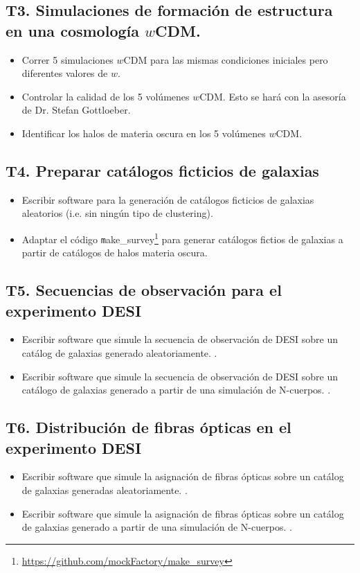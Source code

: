 \subsection*{T3. Simulaciones de formaci\'on de estructura en una
  cosmolog\'ia $w$CDM.}
\begin{itemize}
\item[T3.1] \gradA Correr 5 simulaciones $w$CDM para las mismas condiciones
  iniciales pero diferentes valores de $w$.
\item[T3.2] \gradA Controlar la calidad de los 5 vol\'umenes $w$CDM. Esto se
  har\'a con la asesor\'ia de Dr. Stefan Gottloeber.
\item[T3.3] \gradA Identificar los halos de materia oscura en los 5 vol\'umenes $w$CDM.
\end{itemize}

\subsection*{T4. Preparar cat\'alogos ficticios de galaxias}
\begin{itemize}
\item[T4.1] \gradA\prof Escribir software para la generaci\'on de cat\'alogos
  ficticios de galaxias aleatorios (i.e. sin ning\'un tipo de
  clustering). 
\item[T4.2] \gradA\prof Adaptar el c\'odigo {\texttt
  make\_survey}\footnote{\url{https://github.com/mockFactory/make_survey}}
  para generar  cat\'alogos fictios de galaxias a partir de
  cat\'alogos de halos materia oscura. 
\end{itemize}

\subsection*{T5. Secuencias de observaci\'on para el experimento DESI}
\begin{itemize}
\item[T5.1] \prof Escribir software que simule la secuencia de observaci\'on
  de DESI sobre un cat\'alog de galaxias generado aleatoriamente. \bob.
\item[T5.2] \prof Escribir software que simule la secuencia de observaci\'on
  de DESI sobre un cat\'alogo de galaxias generado a partir de una
  simulaci\'on de N-cuerpos. \bob.
\end{itemize}

\subsection*{T6. Distribuci\'on de fibras \'opticas en el experimento DESI}
\begin{itemize}
\item[T6.1] \prof Escribir software que simule la asignaci\'on de fibras
  \'opticas sobre un cat\'alog de galaxias generadas aleatoriamente.  \bob.
\item[T6.2] \prof Escribir software que simule la asignaci\'on de fibras
  \'opticas sobre un cat\'alog de galaxias generado a partir de una
  simulaci\'on de N-cuerpos. \bob.
\end{itemize}

